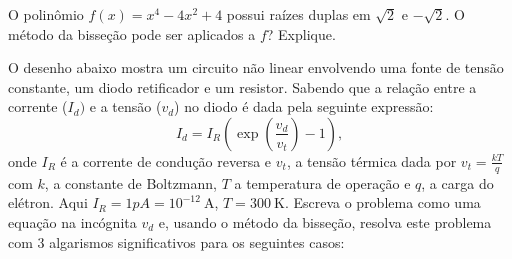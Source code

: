 \begin{Exercise}\label{prob_raiz_dupla} O polinômio $f(x)=x^4-4x^2+4$ possui raízes duplas em $\sqrt{2}$ e $-\sqrt{2}$. O método da bisseção pode ser aplicados a $f$? Explique.
\end{Exercise}

\begin{Exercise}[title=Eletrônica]\label{prob_diodo} O desenho abaixo mostra um circuito não linear envolvendo uma fonte de tensão constante, um diodo retificador e um resistor. Sabendo que a relação entre a corrente ($I_d)$ e a tensão ($v_d$) no diodo é dada pela seguinte expressão:
  \begin{equation*}
    I_d=I_R\left(\exp\left(\frac{v_d}{v_t}\right)-1\right),
  \end{equation*}
onde $I_R$ é a corrente de condução reversa e $v_t$, a tensão térmica dada por $v_t=\frac{kT}{q}$ com $k$, a constante de Boltzmann, $T$ a temperatura de operação e $q$, a carga do elétron. Aqui  $I_R=1pA=10^{-12}~\mbox{A}$, $T=300~\mbox{K}$. Escreva o problema como uma equação na incógnita $v_d$ e, usando o método da bisseção, resolva este problema com 3 algarismos significativos para os seguintes casos:
\end{Exercise}

